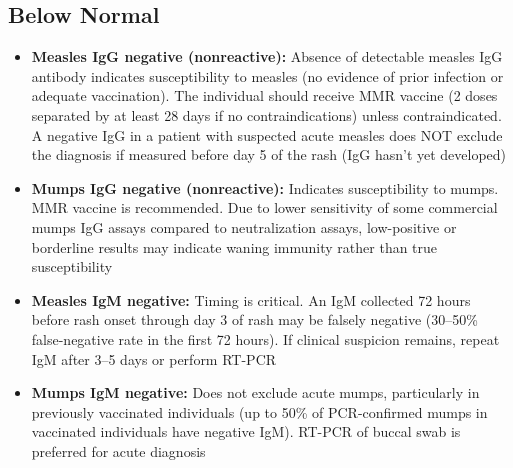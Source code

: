 \subsection*{Below Normal}
\begin{itemize}
  \item \textbf{Measles IgG negative (nonreactive):} Absence of detectable measles IgG antibody indicates susceptibility to measles (no evidence of prior infection or adequate vaccination). The individual should receive MMR vaccine (2 doses separated by at least 28 days if no contraindications) unless contraindicated. A negative IgG in a patient with suspected acute measles does NOT exclude the diagnosis if measured before day 5 of the rash (IgG hasn't yet developed)
  \item \textbf{Mumps IgG negative (nonreactive):} Indicates susceptibility to mumps. MMR vaccine is recommended. Due to lower sensitivity of some commercial mumps IgG assays compared to neutralization assays, low-positive or borderline results may indicate waning immunity rather than true susceptibility
  \item \textbf{Measles IgM negative:} Timing is critical. An IgM collected 72 hours before rash onset through day 3 of rash may be falsely negative (30--50\% false-negative rate in the first 72 hours). If clinical suspicion remains, repeat IgM after 3--5 days or perform RT-PCR
  \item \textbf{Mumps IgM negative:} Does not exclude acute mumps, particularly in previously vaccinated individuals (up to 50\% of PCR-confirmed mumps in vaccinated individuals have negative IgM). RT-PCR of buccal swab is preferred for acute diagnosis
\end{itemize}

